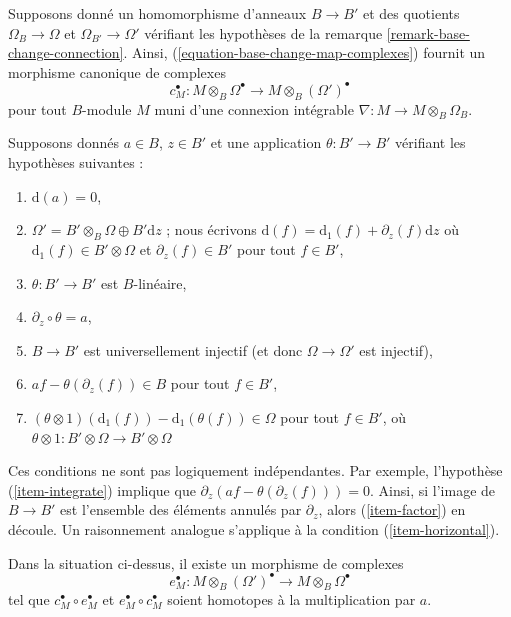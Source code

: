 \medskip\noindent
Supposons donné un homomorphisme d'anneaux $B \to B'$ et des quotients $\Omega_B \to \Omega$ et
$\Omega_{B'} \to \Omega'$ vérifiant les hypothèses de la
remarque \ref{remark-base-change-connection}.
Ainsi, (\ref{equation-base-change-map-complexes}) fournit un
morphisme canonique de complexes
$$
c_M^\bullet :
M \otimes_B \Omega^\bullet
\longrightarrow
M \otimes_B (\Omega')^\bullet
$$
pour tout $B$-module $M$ muni d'une connexion intégrable
$\nabla : M \to M \otimes_B \Omega_B$.

\medskip\noindent
Supposons donnés $a \in B$, $z \in B'$ et une application $\theta : B' \to B'$
vérifiant les hypothèses suivantes :
\begin{enumerate}
\item
\label{item-d-a-zero}
$\text{d}(a) = 0$,
\item
\label{item-direct-sum}
$\Omega' = B' \otimes_B \Omega \oplus B'\text{d}z$ ; nous écrivons
$\text{d}(f) = \text{d}_1(f) + \partial_z(f) \text{d}z$
où $\text{d}_1(f) \in B' \otimes \Omega$ et $\partial_z(f) \in B'$
pour tout $f \in B'$,
\item
\label{item-theta-linear}
$\theta : B' \to B'$ est $B$-linéaire,
\item
\label{item-integrate}
$\partial_z \circ \theta = a$,
\item
\label{item-injective}
$B \to B'$ est universellement injectif (et donc $\Omega \to \Omega'$
est injectif),
\item
\label{item-factor}
$af - \theta(\partial_z(f)) \in B$ pour tout $f \in B'$,
\item
\label{item-horizontal}
$(\theta \otimes 1)(\text{d}_1(f)) - \text{d}_1(\theta(f)) \in \Omega$
pour tout $f \in B'$, où
$\theta \otimes 1 : B' \otimes \Omega \to B' \otimes \Omega$
\end{enumerate}
Ces conditions ne sont pas logiquement indépendantes.
Par exemple, l'hypothèse (\ref{item-integrate}) implique
que $\partial_z(af - \theta(\partial_z(f))) = 0$.
Ainsi, si l'image de $B \to B'$ est l'ensemble des
éléments annulés par $\partial_z$, alors (\ref{item-factor})
en découle. Un raisonnement analogue s'applique à la condition (\ref{item-horizontal}).

\begin{lemma}
\label{lemma-find-homotopy}
Dans la situation ci-dessus, il existe un morphisme de complexes
$$
e_M^\bullet :
M \otimes_B (\Omega')^\bullet
\longrightarrow
M \otimes_B \Omega^\bullet
$$
tel que $c_M^\bullet \circ e_M^\bullet$
et $e_M^\bullet \circ c_M^\bullet$ soient homotopes à
la multiplication par $a$.
\end{lemma}

